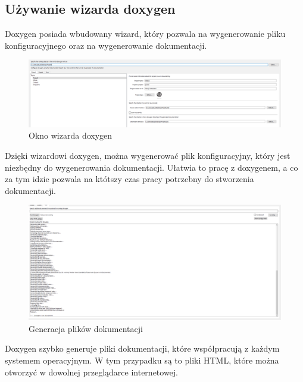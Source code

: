 \documentclass[a4paper,12pt]{article}
\begin{document}
\newpage
\clearpage

\subsection{Używanie wizarda doxygen}
Doxygen posiada wbudowany wizard, który pozwala na wygenerowanie pliku konfiguracyjnego oraz na wygenerowanie dokumentacji.
\begin{figure}[ht]
    \centering
    \includegraphics[width=1\textwidth]{images/dox-generacja.png}
    \caption{Okno wizarda doxygen}
\end{figure}

Dzięki wizardowi doxygen, można wygenerować plik konfiguracyjny, który jest niezbędny do wygenerowania dokumentacji. Ułatwia to pracę z doxygenem, a co za tym idzie pozwala na któtszy czas pracy potrzebny do stworzenia dokumentacji.

\begin{figure}[ht]
    \centering
    \includegraphics[width=1\textwidth]{images/dox-generacja-2.png}
    \caption{Generacja plików dokumentacji}
\end{figure}

Doxygen szybko generuje pliki dokumentacji, które współpracują
z każdym systemem operacyjnym. W tym przypadku są to pliki HTML, które można otworzyć w dowolnej przeglądarce internetowej.

\newpage
\clearpage
\end{document}
